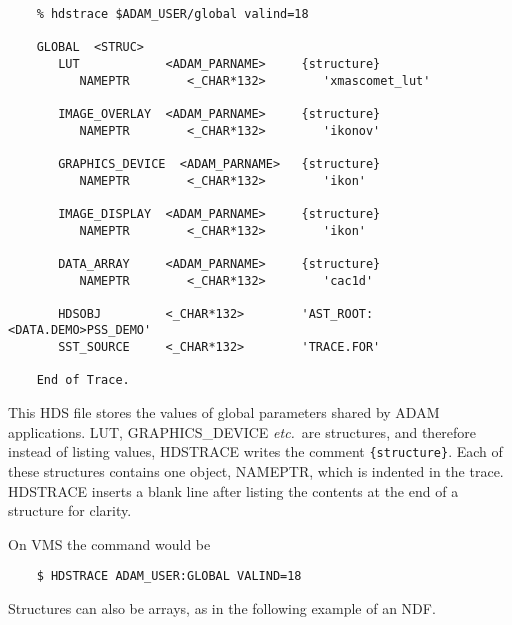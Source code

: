 \small
\begin{verbatim}
    % hdstrace $ADAM_USER/global valind=18

    GLOBAL  <STRUC>
       LUT            <ADAM_PARNAME>     {structure}
          NAMEPTR        <_CHAR*132>        'xmascomet_lut'

       IMAGE_OVERLAY  <ADAM_PARNAME>     {structure}
          NAMEPTR        <_CHAR*132>        'ikonov'

       GRAPHICS_DEVICE  <ADAM_PARNAME>   {structure}
          NAMEPTR        <_CHAR*132>        'ikon'

       IMAGE_DISPLAY  <ADAM_PARNAME>     {structure}
          NAMEPTR        <_CHAR*132>        'ikon'

       DATA_ARRAY     <ADAM_PARNAME>     {structure}
          NAMEPTR        <_CHAR*132>        'cac1d'

       HDSOBJ         <_CHAR*132>        'AST_ROOT:<DATA.DEMO>PSS_DEMO'
       SST_SOURCE     <_CHAR*132>        'TRACE.FOR'

    End of Trace.
\end{verbatim}
\normalsize

This HDS file stores the values of global parameters shared by ADAM
applications.  LUT, GRAPHICS\_DEVICE {\it etc.}\ are structures, and
therefore instead of listing values, {\footnotesize HDSTRACE} writes the
comment {\tt \{structure\}}.  Each of these structures contains one
object, NAMEPTR, which is indented in the trace.  {\footnotesize HDSTRACE} inserts
a blank line after listing the contents at the end of a structure for
clarity.

On VMS the command would be

\small
\begin{verbatim}
    $ HDSTRACE ADAM_USER:GLOBAL VALIND=18
\end{verbatim}
\normalsize
Structures can also be arrays, as in the following example of an NDF.


